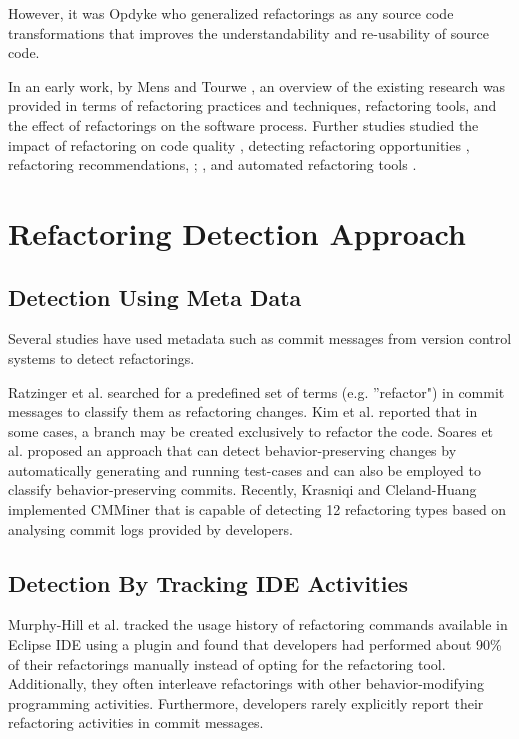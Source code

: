 \documentclass[letterpaper,12pt,onecolumn,final]{report}
\begin{document}
However, it was Opdyke \cite{OPDYKE1990} who generalized refactorings as any source code transformations that improves the understandability and re-usability of source code.

In an early work, by Mens and Tourwe \cite{Mens2004}, an overview of the existing research was provided in terms of refactoring practices and techniques, refactoring tools, and the effect of refactorings on the software process. Further studies studied the impact of refactoring on code quality \cite{Moser2006} \cite{wilking2007empirical} \cite{bavota2015experimental} \cite{cedrim2016does} \cite{pantiuchina2018improving} \cite{alomar2019impact},  detecting refactoring opportunities \cite{fontana2012automatic} \cite{palomba2013detecting}, refactoring recommendations, \cite{mkaouer2015many}; \cite{bavota2014recommending} \cite{ouni2016multi}, and automated refactoring tools \cite{roberts1997refactoring} \cite{mazinanian2016jdeodorant} \cite{Kim2010} \cite{Tsantalis2018} \cite{Silva2020} \cite{Moghadam2021}.

\section{Refactoring Detection Approach}
\subsection{Detection Using Meta Data}
Several studies have used metadata such as commit messages from version control systems to detect refactorings. 

Ratzinger et al. \cite{ratzinger2008relation} searched for a predefined set of terms (e.g. ”refactor") in commit messages to classify them as refactoring changes. Kim et al. \cite{kim2014empirical} reported that in some cases, a branch may be created exclusively to refactor the code. Soares et al. \cite{soares2010making} proposed an approach that can detect behavior-preserving changes by automatically generating and running test-cases and can also be employed to classify behavior-preserving commits. Recently, Krasniqi and Cleland-Huang \cite{Krasniqi2020} implemented CMMiner that is capable of detecting 12 refactoring types based on analysing commit logs provided by developers.

\subsection{Detection By Tracking IDE Activities}
Murphy-Hill et al. \cite{MurphyHill2012} tracked the usage history of refactoring commands available in Eclipse IDE using a plugin and found that developers had performed about 90\% of their refactorings manually instead of opting for the refactoring tool. Additionally, they often interleave refactorings with other behavior-modifying programming activities. Furthermore, developers rarely explicitly report their refactoring activities in commit messages.
\end{document}
